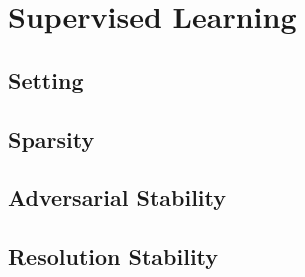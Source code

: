 \chapter{Supervised Learning}\label{ch:SL}

\cite{bungert2021clip, bungert2021neural, kabri2023resolution, bungert2022bregman}
%
\section{Setting}
%
\section{Sparsity}
%
\section{Adversarial Stability}
%
\section{Resolution Stability}
%

